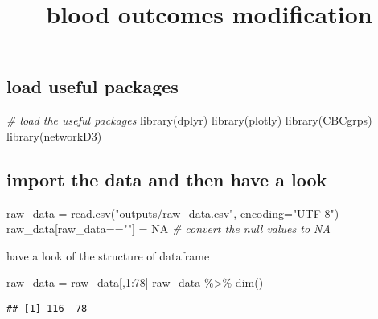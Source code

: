 \documentclass[
]{article}
\title{blood outcomes modification}
\author{}
\date{\vspace{-2.5em}}
\newenvironment{Shaded}{\begin{snugshade}}{\end{snugshade}}
\newcommand{\AttributeTok}[1]{\textcolor[rgb]{0.77,0.63,0.00}{#1}}
\newcommand{\CommentTok}[1]{\textcolor[rgb]{0.56,0.35,0.01}{\textit{#1}}}
\newcommand{\ConstantTok}[1]{\textcolor[rgb]{0.00,0.00,0.00}{#1}}
\newcommand{\DecValTok}[1]{\textcolor[rgb]{0.00,0.00,0.81}{#1}}
\newcommand{\FunctionTok}[1]{\textcolor[rgb]{0.00,0.00,0.00}{#1}}
\newcommand{\NormalTok}[1]{#1}
\newcommand{\OtherTok}[1]{\textcolor[rgb]{0.56,0.35,0.01}{#1}}
\newcommand{\SpecialCharTok}[1]{\textcolor[rgb]{0.00,0.00,0.00}{#1}}
\newcommand{\StringTok}[1]{\textcolor[rgb]{0.31,0.60,0.02}{#1}}
\begin{document}
\maketitle

\hypertarget{load-useful-packages}{%
\subsection{load useful packages}\label{load-useful-packages}}

\begin{Shaded}
\begin{Highlighting}[]
\CommentTok{\# load the useful packages}
\FunctionTok{library}\NormalTok{(dplyr)}
\FunctionTok{library}\NormalTok{(plotly)}
\FunctionTok{library}\NormalTok{(CBCgrps)}
\FunctionTok{library}\NormalTok{(networkD3)}
\end{Highlighting}
\end{Shaded}

\hypertarget{import-the-data-and-then-have-a-look}{%
\subsection{import the data and then have a
look}\label{import-the-data-and-then-have-a-look}}

\begin{Shaded}
\begin{Highlighting}[]
\NormalTok{raw\_data }\OtherTok{=} \FunctionTok{read.csv}\NormalTok{(}\StringTok{"outputs/raw\_data.csv"}\NormalTok{, }\AttributeTok{encoding=}\StringTok{"UTF{-}8"}\NormalTok{)}
\NormalTok{raw\_data[raw\_data}\SpecialCharTok{==}\StringTok{""}\NormalTok{] }\OtherTok{=} \ConstantTok{NA} \CommentTok{\# convert the null values to NA}
\end{Highlighting}
\end{Shaded}

have a look of the structure of dataframe

\begin{Shaded}
\begin{Highlighting}[]
\NormalTok{raw\_data }\OtherTok{=}\NormalTok{ raw\_data[,}\DecValTok{1}\SpecialCharTok{:}\DecValTok{78}\NormalTok{]}
\NormalTok{raw\_data }\SpecialCharTok{\%\textgreater{}\%} \FunctionTok{dim}\NormalTok{()}
\end{Highlighting}
\end{Shaded}

\begin{verbatim}
## [1] 116  78
\end{verbatim}
\end{document}
